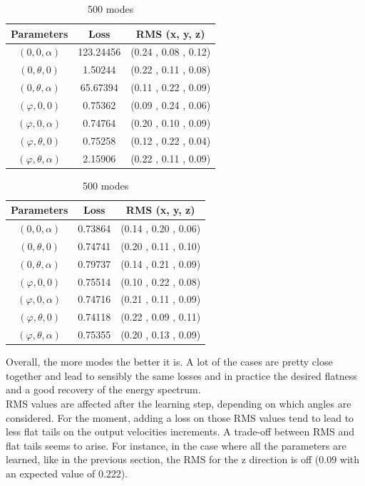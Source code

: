 \documentclass[a4paper,12pt]{article}
\theoremstyle{definition}
\begin{document}
\begin{table}[!htb]
    \caption{Losses obtain for different parameter combination}
    \begin{subtable}{.5\linewidth}
      \centering
        \caption{250 modes}
        \begin{tabular}{ c | c | c }
        Parameters & Loss & RMS (x, y, z)\\
        \hline
        $(0,0,\alpha)$ & 123.24456 & (0.24 , 0.08 , 0.12)\\
        $(0, \theta, 0)$ & 1.50244 & (0.22 , 0.11 , 0.08)\\
        $(0, \theta,\alpha)$ & 65.67394 & (0.11 , 0.22 , 0.09)\\
        $(\varphi, 0, 0)$ & 0.75362 & (0.09 , 0.24 , 0.06)\\
        $(\varphi, 0, \alpha)$ & 0.74764 & (0.20 , 0.10 , 0.09)\\
        $(\varphi,\theta, 0)$ & 0.75258 & (0.12 , 0.22 , 0.04)\\
        $(\varphi,\theta,\alpha)$ & 2.15906 & (0.22 , 0.11 , 0.09)\\
    \end{tabular}
    \end{subtable}%
    \begin{subtable}{.5\linewidth}
      \centering
        \caption{500 modes}
        \begin{tabular}{ c | c | c }
        Parameters & Loss & RMS (x, y, z)\\
        \hline
        $(0,0,\alpha)$ & 0.73864 & (0.14 , 0.20 , 0.06)\\
        $(0, \theta, 0)$ & 0.74741 & (0.20 , 0.11 , 0.10)\\
        $(0, \theta,\alpha)$ & 0.79737 & (0.14 , 0.21 , 0.09)\\
        $(\varphi, 0, 0)$ & 0.75514 & (0.10 , 0.22 , 0.08)\\
        $(\varphi, 0, \alpha)$ & 0.74716 & (0.21 , 0.11 , 0.09)\\
        $(\varphi,\theta, 0)$ & 0.74118 & (0.22 , 0.09 , 0.11)\\
        $(\varphi,\theta,\alpha)$ & 0.75355 & (0.20 , 0.13 , 0.09)\\
        \end{tabular}
    \end{subtable} 
\end{table}


Overall, the more modes the better it is. A lot of the cases are pretty close together and lead to sensibly the same losses and in practice the desired flatness and a good recovery of the energy spectrum. \\
RMS values are affected after the learning step, depending on which angles are considered. For the moment, adding a loss on those RMS values tend to lead to less flat tails on the output velocities increments. A trade-off between RMS and flat tails seems to arise. For instance, in the case where all the parameters are learned, like in the previous section, the RMS for the z direction is off (0.09 with an expected value of 0.222).
\end{document}
